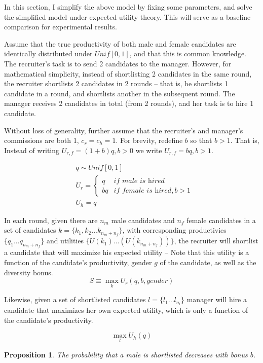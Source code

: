 \documentclass[11pt]{article}
\newtheorem{proposition}{Proposition}
\begin{document}
In this section, I simplify the above model by fixing some parameters, and solve the simplified model under expected utility theory. This will serve as a baseline comparison for experimental results.

Assume that the true productivity of both male and female candidates are identically distributed under $\textit{Unif}[0,1]$, and that this is common knowledge.
The recruiter's task is to send 2 candidates to the manager. However, for mathematical simplicity, instead of shortlisting 2 candidates in the same round, the recruiter shortlists 2 candidates in 2 rounds -- that is, he shortlists 1 candidate in a round, and shortlists another in the subsequent round. The manager receives 2 candidates in total (from 2 rounds), and her task is to hire 1 candidate.

Without loss of generality, further assume that the recruiter's and manager's commissions are both 1, $c_r=c_h=1$. For brevity, redefine $b$ so that $b>1$. That is, Instead of writing $U_{r,f} = (1+b)q, b>0$  we write $U_{r,f} = bq, b>1$.

\begin{align*}
     & q \sim \textit{Unif}[0,1] \\
     & U_r =
    \begin{cases}
        q  & \textit{if male is hired}        \\
        bq & \textit{if female is hired}, b>1
    \end{cases}    \\
     & U_h = q
\end{align*}

In each round, given there are $n_m$ male candidates and $n_f$ female candidates in a set of candidates $k=\{k_1, k_2...k_{n_m+n_f}\}$, with corresponding productivies $\{q_1...q_{n_m+n_f}\}$ and utilities  $\{U(k_1)...(U(k_{n_m+n_f}))\}$, the recruiter will shortlist a candidate that will maximize his expected utility -- Note that this utility is a function of the candidate's productivity, gender $g$ of the candidate, as well as the diversity bonus.
$$S \equiv \max_k U_r(q, b, \textit{gender})$$

Likewise, given a set of shortlisted candidates $l=\{l_1...l_{n_l}\}$ manager will hire a candidate that maximizes her own expected utility, which is only a function of the candidate's productivity.

$$\max_l U_h(q)$$


\begin{proposition}
    The probability that a male is shortlisted decreases with bonus $b$.
\end{proposition}
\end{document}
